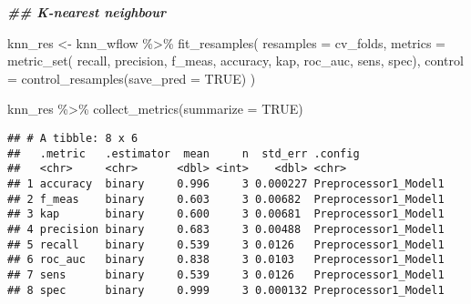 \documentclass[
]{article}
\newenvironment{Shaded}{\begin{snugshade}}{\end{snugshade}}
\newcommand{\AttributeTok}[1]{\textcolor[rgb]{0.77,0.63,0.00}{#1}}
\newcommand{\ConstantTok}[1]{\textcolor[rgb]{0.00,0.00,0.00}{#1}}
\newcommand{\DocumentationTok}[1]{\textcolor[rgb]{0.56,0.35,0.01}{\textbf{\textit{#1}}}}
\newcommand{\FunctionTok}[1]{\textcolor[rgb]{0.00,0.00,0.00}{#1}}
\newcommand{\NormalTok}[1]{#1}
\newcommand{\OtherTok}[1]{\textcolor[rgb]{0.56,0.35,0.01}{#1}}
\newcommand{\SpecialCharTok}[1]{\textcolor[rgb]{0.00,0.00,0.00}{#1}}
\begin{document}
\begin{Shaded}
\begin{Highlighting}[]
\DocumentationTok{\#\# K{-}nearest neighbour}

\NormalTok{knn\_res }\OtherTok{\textless{}{-}} 
\NormalTok{  knn\_wflow }\SpecialCharTok{\%\textgreater{}\%} 
  \FunctionTok{fit\_resamples}\NormalTok{(}
    \AttributeTok{resamples =}\NormalTok{ cv\_folds, }
    \AttributeTok{metrics =} \FunctionTok{metric\_set}\NormalTok{(}
\NormalTok{      recall, precision, f\_meas, }
\NormalTok{      accuracy, kap,}
\NormalTok{      roc\_auc, sens, spec),}
    \AttributeTok{control =} \FunctionTok{control\_resamples}\NormalTok{(}\AttributeTok{save\_pred =} \ConstantTok{TRUE}\NormalTok{)}
\NormalTok{    ) }

\NormalTok{knn\_res }\SpecialCharTok{\%\textgreater{}\%} \FunctionTok{collect\_metrics}\NormalTok{(}\AttributeTok{summarize =} \ConstantTok{TRUE}\NormalTok{)}
\end{Highlighting}
\end{Shaded}

\begin{verbatim}
## # A tibble: 8 x 6
##   .metric   .estimator  mean     n  std_err .config             
##   <chr>     <chr>      <dbl> <int>    <dbl> <chr>               
## 1 accuracy  binary     0.996     3 0.000227 Preprocessor1_Model1
## 2 f_meas    binary     0.603     3 0.00682  Preprocessor1_Model1
## 3 kap       binary     0.600     3 0.00681  Preprocessor1_Model1
## 4 precision binary     0.683     3 0.00488  Preprocessor1_Model1
## 5 recall    binary     0.539     3 0.0126   Preprocessor1_Model1
## 6 roc_auc   binary     0.838     3 0.0103   Preprocessor1_Model1
## 7 sens      binary     0.539     3 0.0126   Preprocessor1_Model1
## 8 spec      binary     0.999     3 0.000132 Preprocessor1_Model1
\end{verbatim}
\end{document}
